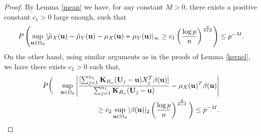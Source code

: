 \documentclass[11pt]{article}
\theoremstyle{definition}
\begin{document}
 \begin{proof}
 	
 	By
 	Lemma \ref{mean} we have, for any constant $M>0$, there exists a positive
 	constant $c_1>0$ large enough, such that
 	\begin{equation}\label{lemma2_1}
 		P\left(\sup_{{\bf u}\in \Omega_d}|\hat{\mu}_X({\bf u})-\hat{\mu}_Y({\bf u})-\mu_X({\bf u})+\mu_Y({\bf u})|_{\infty}\geq c_1\left(\frac{\log p}{n}\right)^{\frac{2}{4+d}}\right)\leq p^{-M}.
 	\end{equation}
 	On the other hand, using similar arguments as in the proofs of Lemma \ref{kernel}, we have there exists $c_2>0$ such that,
 	\begin{eqnarray}\label{neweq1}
 		P&\bigg(&\sup_{{\bf u}\in \Omega_d} \left|\frac{[\sum_{j=1}^{n_1}{\bf K}_{H_x}({\bf U}_j-{\bf u})X_{j}^T\beta({\bf u})]}{\sum_{j=1}^{n_1}{\bf K}_{H_x}({\bf U}_j-{\bf u})} -\mu_X({\bf u})^T\beta({\bf u})\right|  \\
 		&&\geq c_2\sup_{{\bf u}\in\Omega_d}|\beta({\bf u})|_2\left(\frac{\log p}{n}\right)^{\frac{2}{4+d}} \bigg)  \leq p^{-M}.    \nonumber
 	\end{eqnarray}
 	
 	
 	

\end{proof}
\end{document}
